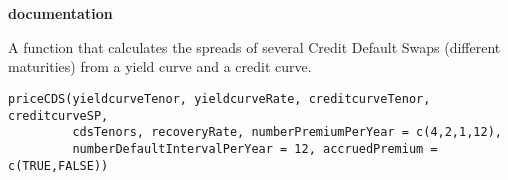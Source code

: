 \documentclass[a4paper]{book}
\begin{document}
\chapter*{}
\begin{center}
{\textbf{\huge \R{} documentation}} \par{}
\par\bigskip{\large \today}
\end{center}
%
\begin{Description}\relax
A function that calculates the spreads of several Credit Default Swaps (different maturities) from a yield curve and a credit curve.
\end{Description}
%
\begin{Usage}
\begin{verbatim}
priceCDS(yieldcurveTenor, yieldcurveRate, creditcurveTenor, creditcurveSP,
		 cdsTenors, recoveryRate, numberPremiumPerYear = c(4,2,1,12),
		 numberDefaultIntervalPerYear = 12, accruedPremium = c(TRUE,FALSE)) 
\end{verbatim}
\end{Usage}
%
\end{document}
